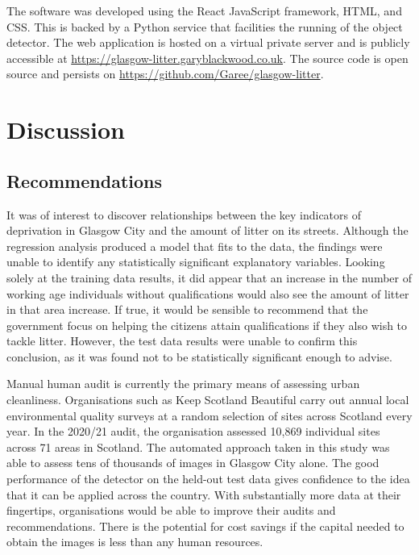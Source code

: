 \documentclass{thesis}
\begin{document}
The software was developed using the React JavaScript framework, HTML, and CSS. This is backed by a Python service that facilities the running of the object detector. The web application is hosted on a virtual private server and is publicly accessible at \url{https://glasgow-litter.garyblackwood.co.uk}. The source code is open source and persists on \url{https://github.com/Garee/glasgow-litter}.



\chapter{Discussion}

\section{Recommendations}

It was of interest to discover relationships between the key indicators of deprivation in Glasgow City and the amount of litter on its streets. Although the regression analysis produced a model that fits to the data, the findings were unable to identify any statistically significant explanatory variables. Looking solely at the training data results, it did appear that an increase in the number of working age individuals without qualifications would also see the amount of litter in that area increase. If true, it would be sensible to recommend that the government focus on helping the citizens attain qualifications if they also wish to tackle litter. However, the test data results were unable to confirm this conclusion, as it was found not to be statistically significant enough to advise.

Manual human audit is currently the primary means of assessing urban cleanliness. Organisations such as Keep Scotland Beautiful carry out annual local environmental quality surveys at a random selection of sites across Scotland every year\cite{leams}. In the 2020/21 audit, the organisation assessed 10,869 individual sites across 71 areas in Scotland. The automated approach taken in this study was able to assess tens of thousands of images in Glasgow City alone. The good performance of the detector on the held-out test data gives confidence to the idea that it can be applied across the country. With substantially more data at their fingertips, organisations would be able to improve their audits and recommendations. There is the potential for cost savings if the capital needed to obtain the images is less than any human resources.
\end{document}
